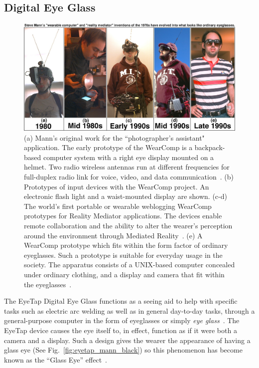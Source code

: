 \subsection{Digital Eye Glass}
\begin{figure}[htb]
\center
 \includegraphics[width=5.5in]{ch1/figures/steve5.jpeg}
 \caption{(a) Mann's original work for the ``photographer's assistant" application. The early prototype 
of the WearComp is a backpack-based computer system with a right eye display mounted on a 
helmet. Two radio wireless antennas run at different frequencies for full-duplex radio link for voice, 
video, and data communication~\cite{mann1994mediated}. (b) Prototypes of input devices with the WearComp 
project. An electronic flash light and a waist-mounted display are shown. (c-d) The world's first portable or 
wearable weblogging WearComp prototypes for Reality Mediator applications. The devices enable 
remote collaboration and the ability to alter the wearer's perception around the environment through 
Mediated Reality~\cite{mann1994mediated}. (e) A WearComp prototype which fits within the form 
factor of ordinary eyeglasses. Such a prototype is suitable for everyday usage in the society. The 
apparatus consists of a UNIX-based computer concealed under ordinary clothing, and a display and 
camera that fit within the eyeglasses~\cite{intelligentimageprocessing}.}
 \label{fig:mannglass}
\end{figure}

The EyeTap Digital Eye Glass functions as a seeing aid to help with specific tasks such as electric arc 
welding as well as in general day-to-day tasks, through a general-purpose computer in the form of 
eyeglasses or simply \emph{eye glass}~\cite{intelligentimageprocessing}. The EyeTap device causes 
the eye itself to, in effect, function as if it were both a camera and a display. Such a design gives the 
wearer the appearance of having a glass eye (See Fig.~\ref{fig:eyetap_mann_black}) so this 
phenomenon has become known as the ``Glass Eye'' effect~\cite{mann260}. 

